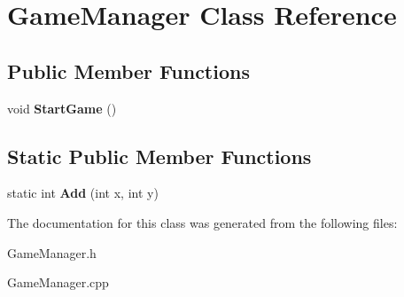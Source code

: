 \hypertarget{class_game_manager}{}\section{Game\+Manager Class Reference}
\label{class_game_manager}
\subsection*{Public Member Functions}
\begin{DoxyCompactItemize}
\item 
\mbox{\label{class_game_manager_a3af49a72977052275a1217c5018c737f}} 
void {\bfseries Start\+Game} ()
\end{DoxyCompactItemize}
\subsection*{Static Public Member Functions}
\begin{DoxyCompactItemize}
\item 
\mbox{\label{class_game_manager_acf7198ccac2dde4da381867356136896}} 
static int {\bfseries Add} (int x, int y)
\end{DoxyCompactItemize}


The documentation for this class was generated from the following files\+:\begin{DoxyCompactItemize}
\item 
Game\+Manager.\+h\item 
Game\+Manager.\+cpp\end{DoxyCompactItemize}
